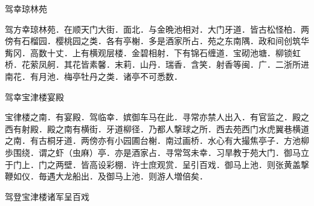 \documentclass[]{article}
\begin{document}
驾幸琼林苑

驾方幸琼林苑．在顺天门大街．面北．与金晩池相对．大门牙道．皆古松怪柏．两傍有石榴园．樱桃园之类．各有亭榭．多是酒家所占．苑之东南隅．政和间创筑华觜冈．高数十丈．上有横观层楼．金碧相射．下有锦石缠道．宝砌池塘．柳锁虹桥．花萦凤舸．其花皆素馨．末莉．山丹．瑞香．含笑．射香等闽．广．二浙所进南花．有月池．梅亭牡丹之类．诸亭不可悉数．

驾幸宝津楼宴殿

宝律楼之南．有宴殿．驾临幸．嫔御车马在此．寻常亦禁人出入．有官监之．殿之西有射殿．殿之南有横街．牙道柳径．乃都人撃球之所．西去苑西门水虎翼巷横道之南．有古桐牙道．两傍亦有小园圃台榭．南过画桥．水心有大撮焦亭子．方池柳歩围绕．谓之虾（虫麻）亭．亦是酒家占．寻常驾未幸．习旱教于苑大门．御马立于门上．门之两壁．皆高设彩棚．许士庶观赏．呈引百戏．御马上池．则张黄盖撃鞭如仪．毎遇大龙船出．及御马上池．则游人増倍矣．

驾登宝津楼诸军呈百戏
\end{document}
